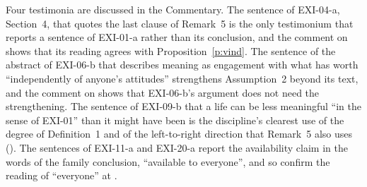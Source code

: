 Four testimonia are discussed in the Commentary. The sentence of EXI-04-a, Section~4, that quotes the last clause of Remark~5 is the only testimonium that reports a sentence of EXI-01-a rather than its conclusion, and the comment on  shows that its reading agrees with Proposition~\ref{p:vind}. The sentence of the abstract of EXI-06-b that describes meaning as engagement with what has worth \enquote{independently of anyone's attitudes} strengthens Assumption~2 beyond its text, and the comment on  shows that EXI-06-b's argument does not need the strengthening. The sentence of EXI-09-b that a life can be less meaningful \enquote{in the sense of EXI-01} than it might have been is the discipline's clearest use of the degree of Definition~1 and of the left-to-right direction that Remark~5 also uses (). The sentences of EXI-11-a and EXI-20-a report the availability claim in the words of the family conclusion, \enquote{available to everyone}, and so confirm the reading of \enquote{everyone} at .

{\footnotesize}
